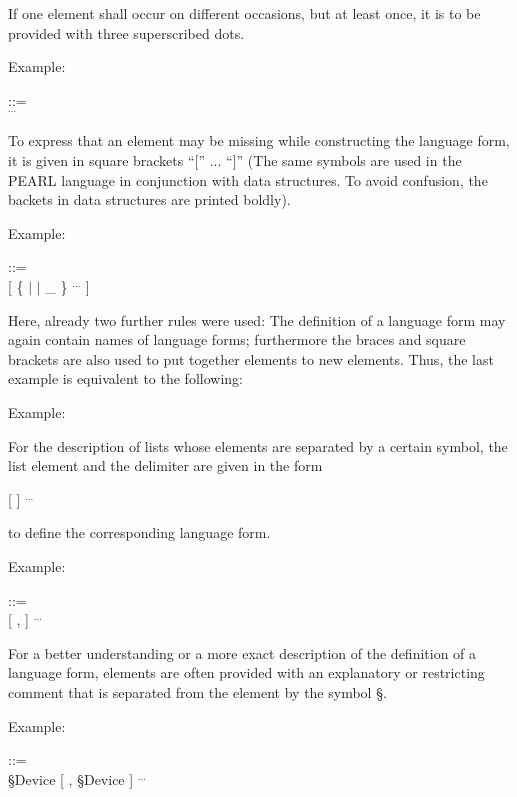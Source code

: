 \begin{grammarframe}
\end{grammarframe}

If one element shall occur on different occasions, but at least once, it
is to be provided with three superscribed dots.

Example:

 ::=\\
\x {} $^{...}$

To express that an element may be missing while constructing the
language form, it is given in square brackets ``['' ... ``]'' (The 
same symbols are used in the PEARL language in conjunction with data structures.
To avoid confusion, the backets in data structures are printed boldly).

Example:

 ::=\\
\x {} [ \{  $\mid$  $\mid$ \_ \} $^{...}$ ]

Here, already two further rules were used: The definition of a language
form may again contain names of language forms; furthermore the braces
and square brackets are also used to put together elements to new
elements. Thus, the last example is equivalent to the following:

Example:

\begin{grammarframe}
\end{grammarframe}


For the description of lists whose elements are separated by a certain
symbol, the list element and the delimiter are given in the form

 [   ] $^{...}$

to define the corresponding language form.

Example:

 ::=\\
\x {} [ ,  ] $^{...}$

For a better understanding or a more exact description of the definition
of a language form, elements are often provided with an explanatory or
restricting comment that is separated from the element by the symbol
\S .

Example:

 ::=\\
\x {}\S  Device [ , \S Device ] $^{...}$

